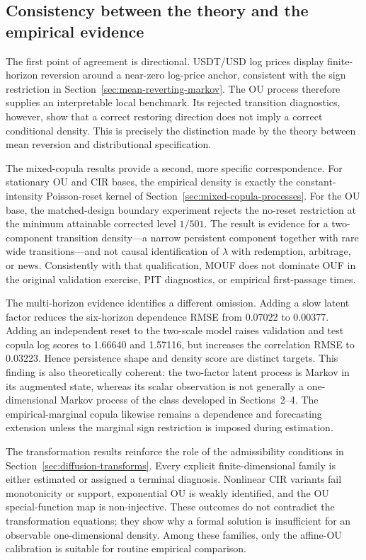 \documentclass[11pt]{article}
\newcommand{\1}{\mathbf{1}}
\begin{document}
\subsection{Consistency between the theory and the empirical evidence}
\label{emp:sec:conclusion}

The first point of agreement is directional.  USDT/USD log prices display
finite-horizon reversion around a near-zero log-price anchor, consistent with
the sign restriction in Section~\ref{sec:mean-reverting-markov}.  The OU process
therefore supplies an interpretable local benchmark.  Its rejected transition
diagnostics, however, show that a correct restoring direction does not imply a
correct conditional density.  This is precisely the distinction made by the
theory between mean reversion and distributional specification.

The mixed-copula results provide a second, more specific correspondence.  For
stationary OU and CIR bases, the empirical density is exactly the
constant-intensity Poisson-reset kernel of
Section~\ref{sec:mixed-copula-processes}.  For the OU base, the matched-design
boundary experiment rejects the no-reset restriction at the minimum attainable
corrected level $1/501$.  The result is evidence for a two-component transition
density---a narrow persistent component together with rare wide
transitions---and not causal identification of $\lambda$ with redemption,
arbitrage, or news.  Consistently with that qualification, MOUF does not dominate
OUF in the original validation exercise, PIT diagnostics, or empirical
first-passage times.

The multi-horizon evidence identifies a different omission.  Adding a slow
latent factor reduces the six-horizon dependence RMSE from 0.07022 to 0.00377.
Adding an independent reset to the two-scale model raises validation and test
copula log scores to 1.66640 and 1.57116, but increases the correlation RMSE to
0.03223.  Hence persistence shape and density score are distinct targets.  This
finding is also theoretically coherent: the two-factor latent process is Markov
in its augmented state, whereas its scalar observation is not generally a
one-dimensional Markov process of the class developed in Sections~2--4.  The
empirical-marginal copula likewise remains a dependence and forecasting
extension unless the marginal sign restriction is imposed during estimation.

The transformation results reinforce the role of the admissibility conditions
in Section~\ref{sec:diffusion-transforms}.  Every explicit finite-dimensional
family is either estimated or assigned a terminal diagnosis.  Nonlinear CIR
variants fail monotonicity or support, exponential OU is weakly identified, and
the OU special-function map is non-injective.  These outcomes do not contradict
the transformation equations; they show why a formal solution is insufficient
for an observable one-dimensional density.  Among these families, only the
affine-OU calibration is suitable for routine empirical comparison.
\end{document}
